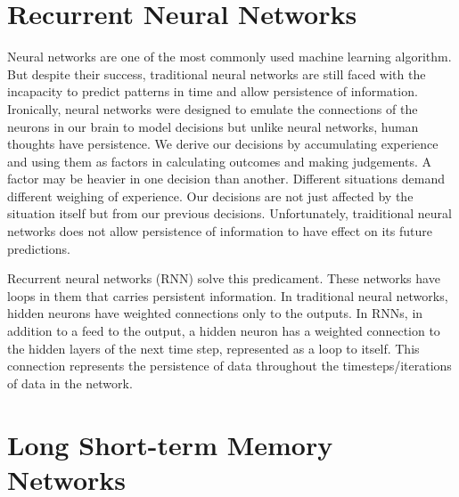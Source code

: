 \section{Recurrent Neural Networks}

    Neural networks are one of the most commonly used machine learning algorithm. But despite their success, traditional neural networks are still faced with the incapacity to predict patterns in time and allow persistence of information. Ironically, neural networks were designed to emulate the connections of the neurons in our brain to model decisions but unlike neural networks, human thoughts have persistence. We derive our decisions by accumulating experience and using them as factors in calculating outcomes and making judgements. A factor may be heavier in one decision than another. Different situations demand different weighing of experience. Our decisions are not just affected by the situation itself but from our previous decisions. Unfortunately, traiditional neural networks does not allow persistence of information to have effect on its future predictions.

    Recurrent neural networks (RNN) solve this predicament. These networks have loops in them that carries persistent information. In traditional neural networks, hidden neurons have weighted connections only to the outputs. In RNNs, in addition to a feed to the output, a hidden neuron has a weighted connection to the hidden layers of the next time step, represented as a loop to itself. This connection represents the persistence of data throughout the timesteps/iterations of data in the network.

\section{Long Short-term Memory Networks}

